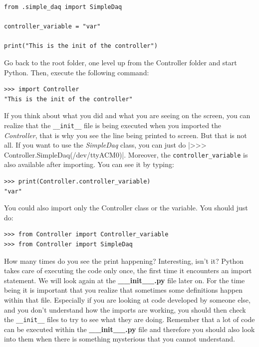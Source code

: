 \begin{verbatim}
from .simple_daq import SimpleDaq

controller_variable = "var"

print("This is the init of the controller")
\end{verbatim}

Go back to the root folder, one level up from the Controller folder and start Python. Then, execute the following command:

\begin{verbatim}
>>> import Controller
"This is the init of the controller"
\end{verbatim}

If you think about what you did and what you are seeing on the screen, you can realize that the \texttt{\_\_init\_\_} file is being executed when you imported the \emph{Controller}, that is why you see the line being printed to screen. But that is not all. If you want to use the \emph{SimpleDaq}
class, you can just do |>>> Controller.SimpleDaq(/dev/ttyACM0)|. Moreover, the \texttt{controller_variable} is also available after importing. You can see it by typing:

\begin{verbatim}
>>> print(Controller.controller_variable)
"var"
\end{verbatim}

You could also import only the Controller class or the variable. You should just do:

\begin{verbatim}
>>> from Controller import Controller_variable
>>> from Controller import SimpleDaq
\end{verbatim}

How many times do you see the print happening? Interesting, isn't it? Python takes care of executing the code only once, the first time it
encounters an import statement. We will look again at the \textbf{\_\_init\_\_.py} file later on. For the time being it is
important that you realize that sometimes some definitions happen within that file. Especially if you are looking at code developed by someone else, and you don't understand how the imports are working, you should then check the \texttt{\_\_init\_\_} files to try to see what they are doing. Remember that a lot of code can be executed within the \textbf{\_\_init\_\_.py} file and therefore you should also look into them when there is
something mysterious that you cannot understand.

